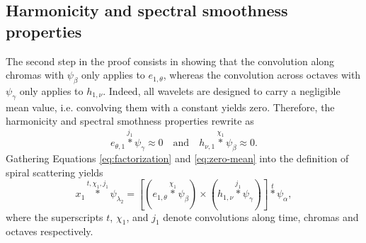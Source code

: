 \documentclass[twoside,a4paper]{article}
\begin{document}
\subsection{Harmonicity and spectral smoothness properties}
The second step in the proof consists in showing that the convolution along chromas with $\psi_\beta$ only applies to $e_{1,\theta}$, whereas the convolution across octaves with $\psi_\gamma$ only applies to $h_{1,\nu}$. Indeed, all wavelets are designed to carry a negligible mean value, i.e. convolving them with a constant yields zero. Therefore, the harmonicity and spectral smothness properties rewrite as
\begin{equation}
e_{\theta,1}\overset{j_{1}}{\ast}\psi_{\gamma}\approx0
\quad\mbox{and}\quad
h_{\nu,1}\overset{\chi_{1}}{\ast}\psi_{\beta}\approx0.
\label{eq:zero-mean}
\end{equation}
Gathering Equations \ref{eq:factorization} and \ref{eq:zero-mean} into the definition of spiral scattering yields
\begin{equation}
x_1 \overset{t,\chi_{1},j_{1}}{\ast} \psi_{\lambda_2} = \left[
\left( e_{1,\theta} \overset{\chi_{1}}{\ast} \psi_{\beta} \right)
\times
\left( h_{1,\nu} \overset{j_{1}}{\ast} \psi_{\gamma} \right)
\right]
\overset{t}{\ast} \psi_\alpha,
\end{equation}
where the superscripts $t$, $\chi_{1}$, and $j_{1}$ denote convolutions along time, chromas and octaves respectively.
\end{document}
